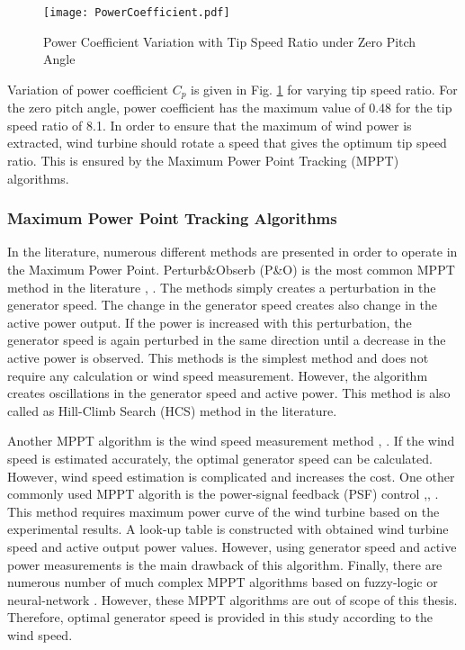 \begin{figure}[h!]
	\centering
	\texttt{[image: PowerCoefficient.pdf]}
	\caption{Power Coefficient Variation with Tip Speed Ratio under Zero Pitch Angle}
	\label{variationofcp}
\end{figure} 
\par
Variation of power coefficient $C_{p}$ is given in Fig. \ref{variationofcp} for varying tip speed ratio. For the zero pitch angle, power coefficient has the maximum value of 0.48 for the tip speed ratio of 8.1. In order to ensure that the maximum of wind power is extracted, wind turbine should rotate a speed that gives the optimum tip speed ratio. This is ensured by the Maximum Power Point Tracking (MPPT) algorithms. 
\subsubsection{Maximum Power Point Tracking Algorithms}
In the literature, numerous different methods are presented in order to operate in the Maximum Power Point. Perturb\&Obserb (P\&O) is the most common MPPT method in the literature \cite{Wang2004}, \cite{Barakati2009}. The methods simply creates a perturbation in the generator speed. The change in the generator speed creates also change in the active power output. If the power is increased with this perturbation, the generator speed is again perturbed in the same direction until a decrease in the active power is observed. This methods is the simplest method and does not require any calculation or wind speed measurement. However, the algorithm creates oscillations in the generator speed and active power. This method is also called as Hill-Climb Search (HCS) method in the literature.\par
Another MPPT algorithm is the wind speed measurement method \cite{Thriringer1993}, \cite{C.A.2013}. If the wind speed is estimated accurately, the optimal generator speed can be calculated. However, wind speed estimation is complicated and increases the cost. One other commonly used MPPT algorith is the power-signal feedback (PSF) control \cite{C.A.2013},\cite{Wang2004}, \cite{Lu2002}. This method requires maximum power curve of the wind turbine based on the experimental results. A look-up table is constructed with obtained wind turbine speed and active output power values. However, using generator speed and active power measurements is the main drawback of this algorithm. Finally, there are numerous number of much complex MPPT algorithms based on fuzzy-logic \cite{Zeng2008} or neural-network \cite{Lin2011}. However, these MPPT algorithms are out of scope of this thesis. Therefore, optimal generator speed is provided in this study according to the wind speed. 
